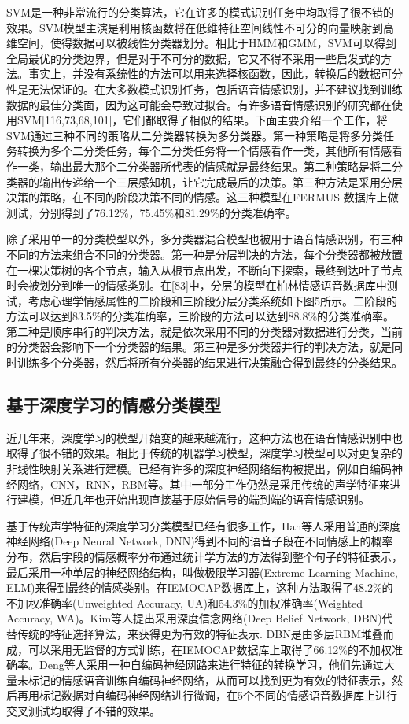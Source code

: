 SVM是一种非常流行的分类算法，它在许多的模式识别任务中均取得了很不错的效果。SVM模型主演是利用核函数将在低维特征空间线性不可分的向量映射到高维空间，使得数据可以被线性分类器划分。相比于HMM和GMM，SVM可以得到全局最优的分类边界，但是对于不可分的数据，它又不得不采用一些启发式的方法。事实上，并没有系统性的方法可以用来选择核函数，因此，转换后的数据可分性是无法保证的。在大多数模式识别任务，包括语音情感识别，并不建议找到训练数据的最佳分类面，因为这可能会导致过拟合。有许多语音情感识别的研究都在使用SVM[116,73,68,101]，它们都取得了相似的结果。下面主要介绍一个工作，将SVM通过三种不同的策略从二分类器转换为多分类器。第一种策略是将多分类任务转换为多个二分类任务，每个二分类任务将一个情感看作一类，其他所有情感看作一类，输出最大那个二分类器所代表的情感就是最终结果。第二种策略是将二分类器的输出传递给一个三层感知机，让它完成最后的决策。第三种方法是采用分层决策的策略，在不同的阶段决策不同的情感。这三种模型在FERMUS \uppercase\expandafter{}数据库上做测试，分别得到了76.12\%，75.45\%和81.29\%的分类准确率。

除了采用单一的分类模型以外，多分类器混合模型也被用于语音情感识别，有三种不同的方法来组合不同的分类器。第一种是分层判决的方法，每个分类器都被放置在一棵决策树的各个节点，输入从根节点出发，不断向下探索，最终到达叶子节点时会被划分到唯一的情感类别。在[83]中，分层的模型在柏林情感语音数据库中测试，考虑心理学情感属性的二阶段和三阶段分层分类系统如下图5所示。二阶段的方法可以达到83.5\%的分类准确率，三阶段的方法可以达到88.8\%的分类准确率。第二种是顺序串行的判决方法，就是依次采用不同的分类器对数据进行分类，当前的分类器会影响下一个分类器的结果。第三种是多分类器并行的判决方法，就是同时训练多个分类器，然后将所有分类器的结果进行决策融合得到最终的分类结果。

\subsection{基于深度学习的情感分类模型}
\label{ssec:dnn_cls}

近几年来，深度学习的模型开始变的越来越流行，这种方法也在语音情感识别中也取得了很不错的效果。相比于传统的机器学习模型，深度学习模型可以对更复杂的非线性映射关系进行建模。已经有许多的深度神经网络结构被提出，例如自编码神经网络，CNN，RNN，RBM等。其中一部分工作仍然是采用传统的声学特征来进行建模，但近几年也开始出现直接基于原始信号的端到端的语音情感识别。

基于传统声学特征的深度学习分类模型已经有很多工作，Han等人采用普通的深度神经网络(Deep Neural Network, DNN)得到不同的语音子段在不同情感上的概率分布，然后字段的情感概率分布通过统计学方法的方法得到整个句子的特征表示，最后采用一种单层的神经网络结构，叫做极限学习器(Extreme Learning Machine, ELM)来得到最终的情感类别。在IEMOCAP数据库上，这种方法取得了48.2\%的不加权准确率(Unweighted Accuracy, UA)和54.3\%的加权准确率(Weighted Accuracy, WA)。Kim等人提出采用深度信念网络(Deep Belief Network, DBN)代替传统的特征选择算法，来获得更为有效的特征表示. DBN是由多层RBM堆叠而成，可以采用无监督的方式训练，在IEMOCAP数据库上取得了66.12\%的不加权准确率。Deng等人采用一种自编码神经网路来进行特征的转换学习，他们先通过大量未标记的情感语音训练自编码神经网络，从而可以找到更为有效的特征表示，然后再用标记数据对自编码神经网络进行微调，在5个不同的情感语音数据库上进行交叉测试均取得了不错的效果。

